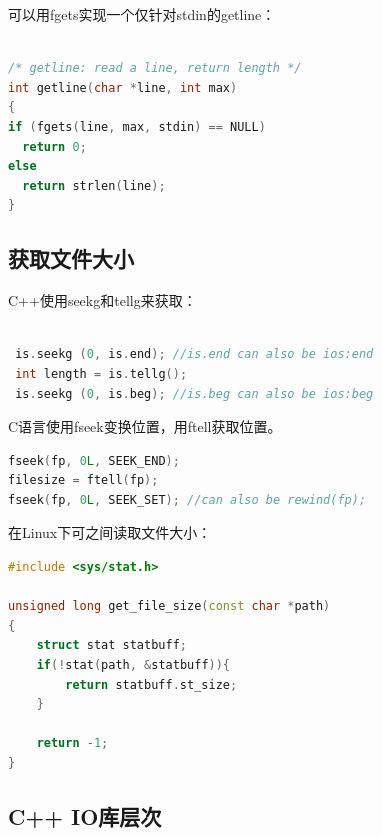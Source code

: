 可以用fgets实现一个仅针对stdin的getline：
\begin{lstlisting}[language=C++]

/* getline: read a line, return length */
int getline(char *line, int max)
{
if (fgets(line, max, stdin) == NULL)
  return 0;
else
  return strlen(line);
}

\end{lstlisting}



\subsection{获取文件大小}


C++使用seekg和tellg来获取：
\begin{lstlisting}[language=C++]

 is.seekg (0, is.end); //is.end can also be ios:end
 int length = is.tellg();
 is.seekg (0, is.beg); //is.beg can also be ios:beg

\end{lstlisting}

C语言使用fseek变换位置，用ftell获取位置。
\begin{lstlisting}[language=C++]
fseek(fp, 0L, SEEK_END);  
filesize = ftell(fp);  
fseek(fp, 0L, SEEK_SET); //can also be rewind(fp);
\end{lstlisting}

在Linux下可之间读取文件大小：
\begin{lstlisting}[language=C++]
#include <sys/stat.h>

unsigned long get_file_size(const char *path)
{
	struct stat statbuff;
	if(!stat(path, &statbuff)){
	    return statbuff.st_size;
	}
	
	return -1;
}
\end{lstlisting}

\subsection{C++ IO库层次}

